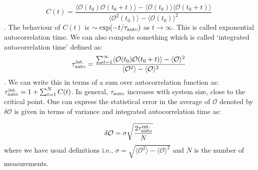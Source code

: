 \documentclass[11pt]{article}
\begin{document}
 \begin{equation}
 	C(t) = \frac{\langle \mathcal{O}(t_0) \mathcal{O}(t_0 + t) \rangle - \langle \mathcal{O}(t_0)\rangle \langle \mathcal{O}(t_0 + t) \rangle}{\langle \mathcal{O}^2(t_0)\rangle - \langle \mathcal{O}(t_0)\rangle^{2}}
 \end{equation}.
The behaviour of $C(t)$ is $\sim \exp(-t/\tau_{\rm{auto}})$ as $ t \to \infty$. This is called exponential autocorrelation time. We can also compute something which is called `integrated autocorrelation time' defined as:
\begin{equation}
	\tau_{\rm{auto}}^{\rm{int.}} = \frac{\sum_{t=1}^{\infty} \langle \mathcal{O}(t_0) \mathcal{O}(t_0 + t) \rangle - \langle \mathcal{O} \rangle^2 }{\langle \mathcal{O}^2\rangle - \langle \mathcal{O}\rangle^{2}}
\end{equation}.
We can write this in terms of a sum over autocorrelation function as: $\tau_{\rm{auto}}^{\rm{int.}} = 1 + \sum_{t=1}^{N} C(t)$. In general, $ \tau_{\rm{auto}}$ increases with system size, close to the critical point. One 
can express the statistical error in the average of $\mathcal{O}$ denoted 
by $\delta \mathcal{O}$ is given in terms of variance and integrated autocorrelation time as:

\begin{equation}
	\delta \mathcal{O} = \sigma \sqrt{\frac{2 \tau_{\rm{auto}}^{\rm{int.}}}{N}}  %
\end{equation}
where we have usual definitions i.e., 
$\sigma = \sqrt{\langle \mathcal{O}^2\rangle - \langle \mathcal{O}\rangle^{2}}$ and $N$ is the number of measurements. 
\end{document}
